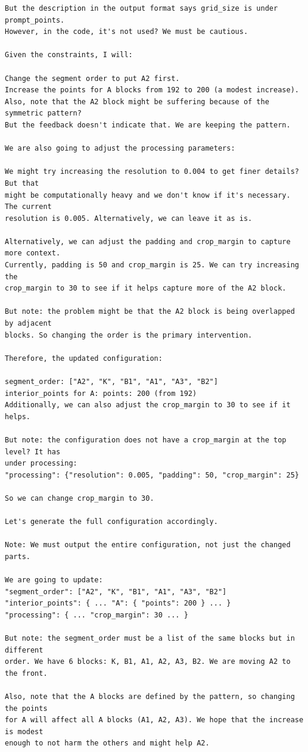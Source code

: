 \begin{lstlisting}[breaklines=true, basicstyle=\footnotesize\ttfamily, frame=single]
But the description in the output format says grid_size is under prompt_points. 
However, in the code, it's not used? We must be cautious.

Given the constraints, I will:

Change the segment order to put A2 first.
Increase the points for A blocks from 192 to 200 (a modest increase).
Also, note that the A2 block might be suffering because of the symmetric pattern? 
But the feedback doesn't indicate that. We are keeping the pattern.

We are also going to adjust the processing parameters:

We might try increasing the resolution to 0.004 to get finer details? But that 
might be computationally heavy and we don't know if it's necessary. The current 
resolution is 0.005. Alternatively, we can leave it as is.

Alternatively, we can adjust the padding and crop_margin to capture more context. 
Currently, padding is 50 and crop_margin is 25. We can try increasing the 
crop_margin to 30 to see if it helps capture more of the A2 block.

But note: the problem might be that the A2 block is being overlapped by adjacent 
blocks. So changing the order is the primary intervention.

Therefore, the updated configuration:

segment_order: ["A2", "K", "B1", "A1", "A3", "B2"]
interior_points for A: points: 200 (from 192)
Additionally, we can also adjust the crop_margin to 30 to see if it helps.

But note: the configuration does not have a crop_margin at the top level? It has 
under processing:
"processing": {"resolution": 0.005, "padding": 50, "crop_margin": 25}

So we can change crop_margin to 30.

Let's generate the full configuration accordingly.

Note: We must output the entire configuration, not just the changed parts.

We are going to update:
"segment_order": ["A2", "K", "B1", "A1", "A3", "B2"]
"interior_points": { ... "A": { "points": 200 } ... }
"processing": { ... "crop_margin": 30 ... }

But note: the segment_order must be a list of the same blocks but in different 
order. We have 6 blocks: K, B1, A1, A2, A3, B2. We are moving A2 to the front.

Also, note that the A blocks are defined by the pattern, so changing the points 
for A will affect all A blocks (A1, A2, A3). We hope that the increase is modest 
enough to not harm the others and might help A2.


\end{lstlisting}

